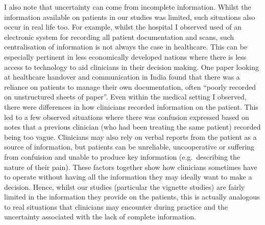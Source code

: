 \documentclass[a4paper, nobind]{templates/ociamthesis}
\begin{document}
\hfill\break
I also note that uncertainty can come from incomplete information. Whilst the information available on patients in our studies was limited, such situations also occur in real life too. For example, whilst the hospital I observed used of an electronic system for recording all patient documentation and scans, such centralisation of information is not always the case in healthcare. This can be especially pertinent in less economically developed nations where there is less access to technology to aid clinicians in their decision making. One paper looking at healthcare handover and communication in India \autocite{humphries_investigating_2018} found that there was a reliance on patients to manage their own documentation, often ``poorly recorded on unstructured sheets of paper''. Even within the medical setting I observed, there were differences in how clinicians recorded information on the patient. This led to a few observed situations where there was confusion expressed based on notes that a previous clinician (who had been treating the same patient) recorded being too vague. Clinicians may also rely on verbal reports from the patient as a source of information, but patients can be unreliable, uncooperative or suffering from confuision and unable to produce key information (e.g.~describing the nature of their pain). These factors together show how clinicians sometimes have to operate without having all the information they may ideally want to make a decision. Hence, whilst our studies (particular the vignette studies) are fairly limited in the information they provide on the patients, this is actually analogous to real situations that clinicians may encounter during practice and the uncertainty associated with the lack of complete information.
\end{document}
